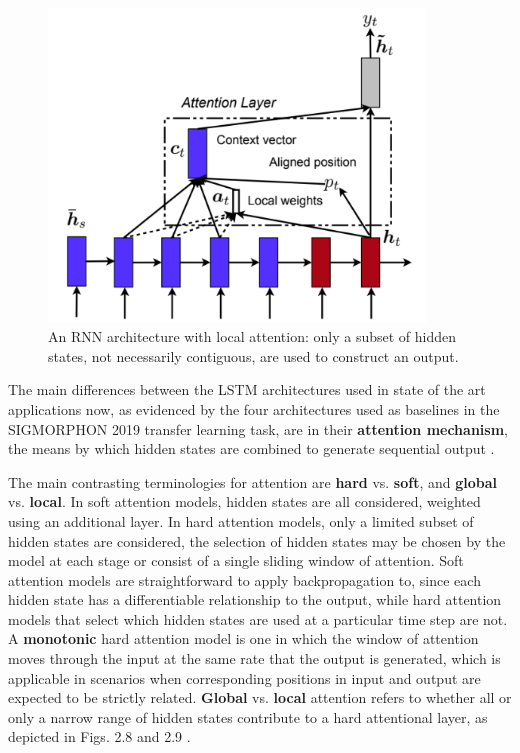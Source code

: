 \begin{figure}[p]
\includegraphics[width=10cm]{images/local.png}
\centering
\caption{An RNN architecture with local attention: only a subset of hidden states, not necessarily contiguous, are used to construct an output. \parencite{Luong2015}}
\end{figure}

The main differences between the LSTM architectures used in state of the art applications now, as evidenced by the four architectures used as baselines in the SIGMORPHON 2019 transfer learning task, are in their \textbf{attention mechanism}, the means by which hidden states are combined to generate sequential output \parencite{Cotterell2019}. 

The main contrasting terminologies for attention are \textbf{hard} vs. \textbf{soft}, and \textbf{global} vs. \textbf{local}. In soft attention models, hidden states are all considered, weighted using an additional layer. In hard attention models, only a limited subset of hidden states are considered, the selection of hidden states may be chosen by the model at each stage or consist of a single sliding window of attention. Soft attention models are straightforward to apply backpropagation to, since each hidden state has a differentiable relationship to the output, while hard attention models that select which hidden states are used at a particular time step are not. A \textbf{monotonic} hard attention model is one in which the window of attention moves through the input at the same rate that the output is generated, which is applicable in scenarios when corresponding positions in input and output are expected to be strictly related. \textbf{Global} vs. \textbf{local} attention refers to whether all or only a narrow range of hidden states contribute to a hard attentional layer, as depicted in Figs. 2.8 and 2.9 \parencite{Luong2015}. 

